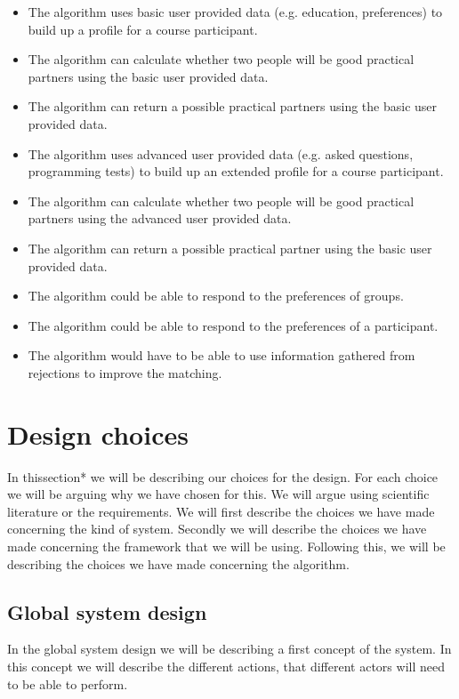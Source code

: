 \begin{itemize}
\item The algorithm uses basic user provided data (e.g. education, preferences) to build up a profile for a course participant.
\item The algorithm can calculate whether two people will be good practical partners using the basic user provided data.
\item The algorithm can return a possible practical partners using the basic user provided data.
\end{itemize}

\begin{itemize}
\item The algorithm uses advanced user provided data (e.g. asked questions, programming tests) to build up an extended profile for a course participant.
\item The algorithm can calculate whether two people will be good practical partners using the advanced user provided data.
\item The algorithm can return a possible practical partner using the basic user provided data.
\item The algorithm could be able to respond to the preferences of groups.
\item The algorithm could be able to respond to the preferences of a participant.
\end{itemize}

\begin{itemize}
\item The algorithm would have to be able to use information gathered from rejections to improve the matching.
\end{itemize}

\section*{Design choices}
In thissection* we will be describing our choices for the design.
For each choice we will be arguing why we have chosen for this.
We will argue using scientific literature or the requirements.
We will first describe the choices we have made concerning the kind of system.
Secondly we will describe the choices we have made concerning the framework that we will be using.
Following this, we will be describing the choices we have made concerning the algorithm.

\subsection*{Global system design}
In the global system design we will be describing a first concept of the system.
In this concept we will describe the different actions, that different actors will need to be able to perform.

